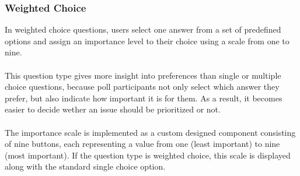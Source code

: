 \documentclass[a4paper,12pt]{report}
\begin{document}
\subsubsection{Weighted Choice}
In weighted choice questions, users select one answer from a set of predefined options and assign an importance level to their choice using a scale from one to nine.\\\\
This question type gives more insight into preferences than single or multiple choice questions, because poll participants not only select which answer they prefer, but also indicate how important it is for them. As a result, it becomes easier to decide wether an issue should be prioritized or not.\\\\
The importance scale is implemented as a custom designed component consisting of nine buttons, each representing a value from one (least important) to nine (most important). If the question type is weighted choice, this scale is displayed along with the standard single choice option.\\\\
\end{document}
